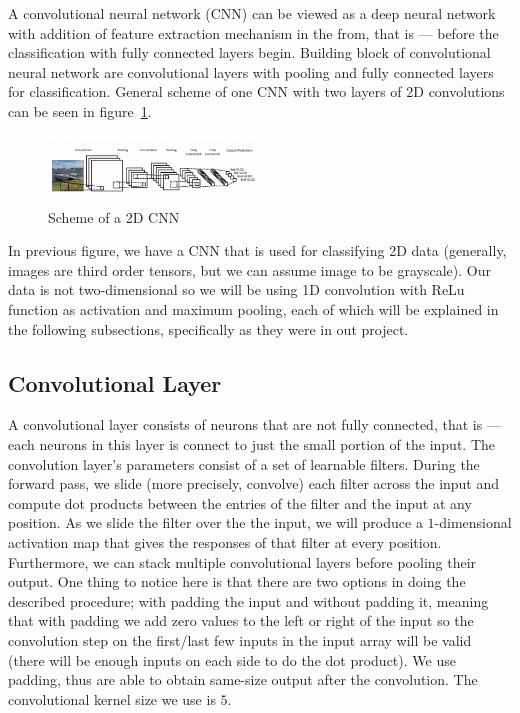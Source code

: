 \documentclass[twoside]{article}
\begin{document}
\begin{multicols}{2}
A convolutional neural network (CNN) can be viewed as a deep neural network with addition of feature extraction mechanism in the from, that is --- before the classification with fully connected layers begin. Building block of convolutional neural network are convolutional layers with pooling and fully connected layers for classification. General scheme of one CNN with two layers of 2D convolutions can be seen in figure~\ref{fig:cnn}.
\begin{figure}[H]
\includegraphics[width=0.5\textwidth]{cnn}
\caption{Scheme of a 2D CNN}
\label{fig:cnn}
\end{figure}

In previous figure, we have a CNN that is used for classifying 2D data (generally, images are third order tensors, but we can assume image to be grayscale). Our data is not two-dimensional so we will be using 1D convolution with ReLu function as activation and maximum pooling, each of which will be explained in the following subsections, specifically as they were in out project.

\subsection{Convolutional Layer}
A convolutional layer consists of neurons that are not fully connected, that is --- each neurons in this layer is connect to just the small portion of the input. The convolution layer’s parameters consist of a set of learnable filters. During the forward pass, we slide (more precisely, convolve) each filter across the input and compute dot products between the entries of the filter and the input at any position. As we slide the filter over the the input, we will produce a $1$-dimensional activation map that gives the responses of that filter at every position. Furthermore, we can stack multiple convolutional layers before pooling their output. One thing to notice here is that there are two options in doing the described procedure; with padding the input and without padding it, meaning that with padding we add zero values to the left or right of the input so the convolution step on the first/last few inputs in the input array will be valid (there will be enough inputs on each side to do the dot product). We use padding, thus are able to obtain same-size output after the convolution. The convolutional kernel size we use is $5$.


\end{multicols}
\end{document}
